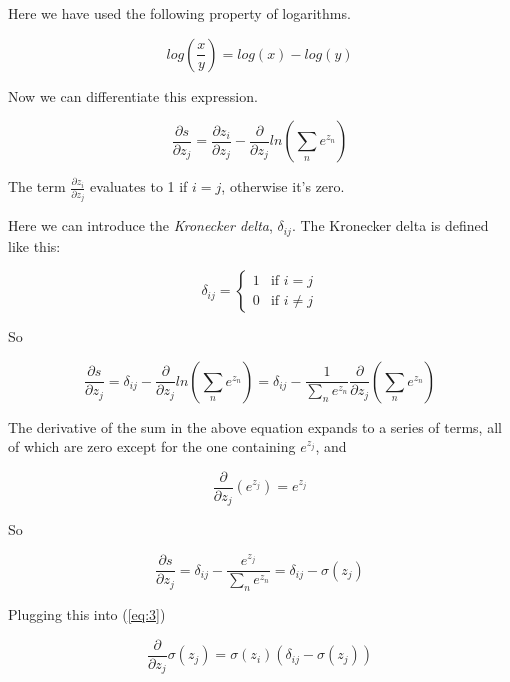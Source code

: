 \documentclass[12pt]{article}
\begin{document}
Here we have used the following property of logarithms.

$$
        log\left(\frac{x}{y}\right) = log(x) - log(y)
$$
\bigskip

Now we can differentiate this expression.

$$
\frac{\partial s}{\partial z_j}=
\frac{\partial z_i}{\partial z_j} - \frac{\partial}{\partial z_j} ln(\sum_n e^{z_n})       
$$
\bigskip

The term $\frac{\partial z_i}{\partial z_j}$ evaluates to 1 if $i = j$, otherwise it's zero.
\bigskip

Here we can introduce the \textit{Kronecker delta}, $\delta_{ij}$.
The Kronecker delta is defined like this:

$$
        \delta_{ij} = 
        \begin{cases}
        1 &\mbox{if } i = j \\
        0 & \mbox{if } i \neq j
        \end{cases}
$$

So

$$
\frac{\partial s}{\partial z_j}
=\delta_{ij} - \frac{\partial}{\partial z_j}ln(  \sum_n e^{z_n})
=\delta_{ij} - \frac{1}{\sum_n e^{z_n}} \frac{\partial}{\partial z_j}(\sum_n e^{z_n})
$$
\bigskip

The derivative of the sum in the above equation expands to a series of terms, all of which are zero except for the one containing $e^{z_j}$, and

$$
        \frac{\partial}{\partial z_j}(e^{z_j})=e^{z_j}
$$ 

So

$$
        \frac{\partial s}{\partial z_j}=
        \delta_{ij} - \frac{e^{z_j}}{\sum_n e^{z_n}}
        =\delta_{ij} - \sigma(z_j)
$$

\bigskip

Plugging this into (\ref{eq:3})

\begin{equation} \label{eq:13}
        \frac{\partial}{\partial z_j}\sigma(z_j)=\sigma(z_i)(\delta_{ij} - \sigma(z_j))
\end{equation}




\end{document}
